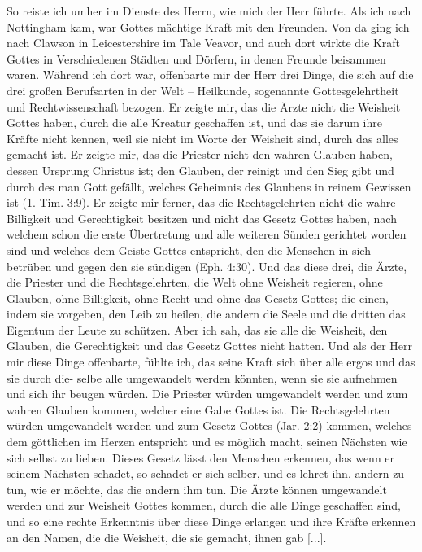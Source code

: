 So reiste ich umher im Dienste des Herrn, wie mich der
Herr führte. Als ich nach Nottingham 
kam, war Gottes mächtige
Kraft mit den Freunden. Von da ging ich nach Clawson in
Leicestershire im Tale Veavor, und auch dort wirkte die Kraft
Gottes in Verschiedenen Städten und Dörfern, in denen Freunde
beisammen waren. Während ich dort war, offenbarte mir der
Herr drei Dinge, die sich auf die drei großen Berufsarten in der
Welt -- Heilkunde, sogenannte Gottesgelehrtheit und 
Rechtwissenschaft bezogen. Er zeigte mir, das die 
Ärzte nicht die
Weisheit Gottes haben, durch die alle Kreatur geschaffen ist, und
das sie darum ihre Kräfte nicht kennen, weil sie nicht im Worte der
Weisheit sind, durch das alles gemacht ist. Er zeigte mir, das
die Priester nicht den wahren Glauben 
haben, dessen Ursprung
Christus ist; den Glauben, der reinigt und den Sieg gibt und
durch des man Gott gefällt, welches Geheimnis des Glaubens
in reinem Gewissen ist (1. Tim. 3:9).
Er zeigte mir ferner, das
die Rechtsgelehrten nicht die wahre 
Billigkeit und Gerechtigkeit
besitzen und nicht das Gesetz Gottes haben, nach welchem schon
die erste Übertretung und alle weiteren Sünden gerichtet worden
sind und welches dem Geiste Gottes entspricht, den die Menschen
in sich betrüben und gegen den sie sündigen 
(Eph. 4:30).
Und das diese drei, die Ärzte, die Priester und die Rechtsgelehrten,
die Welt ohne Weisheit regieren, ohne Glauben, ohne Billigkeit,
ohne Recht und ohne das Gesetz Gottes; die einen, indem sie
vorgeben, den Leib zu heilen, die andern die Seele und die dritten
das Eigentum der Leute zu schützen. Aber ich sah, das sie alle
die Weisheit, den Glauben, die Gerechtigkeit und das Gesetz Gottes
nicht hatten. Und als der Herr mir diese Dinge offenbarte, fühlte
ich, das seine Kraft sich über alle ergos und das sie durch die-
selbe alle umgewandelt werden könnten, wenn sie sie aufnehmen und
sich ihr beugen würden. Die Priester würden umgewandelt werden
und zum wahren Glauben kommen, welcher eine Gabe Gottes
ist. Die Rechtsgelehrten würden umgewandelt werden und zum
Gesetz Gottes (Jar. 2:2) kommen, 
welches dem göttlichen im
Herzen entspricht und es möglich macht, seinen Nächsten wie sich
selbst zu lieben. Dieses Gesetz lässt den Menschen erkennen, das
wenn er seinem Nächsten schadet, so schadet er sich selber, und
es lehret ihn, andern zu tun, wie er möchte, das die andern ihm
tun. Die Ärzte können umgewandelt werden und zur Weisheit
Gottes kommen, durch die alle Dinge geschaffen sind, und so
eine rechte Erkenntnis über diese Dinge erlangen und ihre Kräfte
erkennen an den Namen, die die Weisheit, die sie gemacht, ihnen
gab [...].

